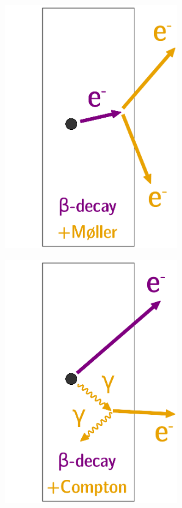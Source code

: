 \begin{figure}[!h]
\begin{subfigure}[t]{0.32\textwidth}
  \includegraphics[width=0.82\textwidth]{SNdemonstrator/fig_SNdemonstrator/internal_contamination_moller.pdf}
  \captionsetup{justification=justified}
  \caption{
    \label{subfig:int_cont_moller}}
\end{subfigure}
\hfill
\begin{subfigure}[t]{0.32\textwidth}
  \centering
  \includegraphics[width=0.82\textwidth]{SNdemonstrator/fig_SNdemonstrator/internal_contamination_compton.pdf}

\end{subfigure}
\end{figure}
